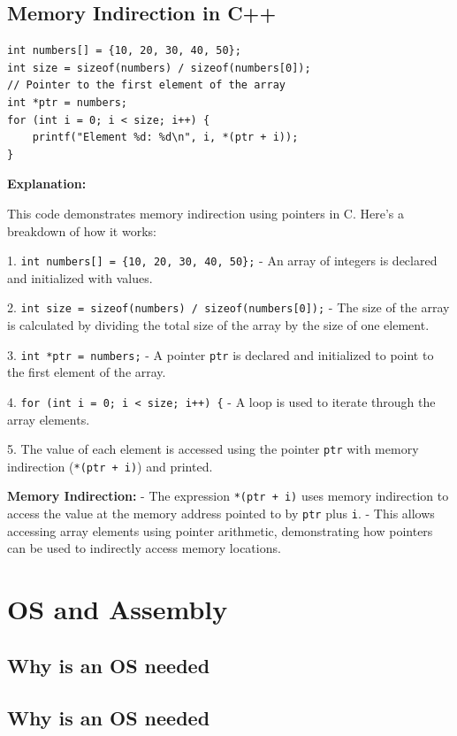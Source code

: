 \documentclass{report}
\begin{document}
\section{Memory Indirection in C++}

\begin{verbatim}
int numbers[] = {10, 20, 30, 40, 50};
int size = sizeof(numbers) / sizeof(numbers[0]);
// Pointer to the first element of the array
int *ptr = numbers;
for (int i = 0; i < size; i++) {
	printf("Element %d: %d\n", i, *(ptr + i));
}
\end{verbatim}

\textbf{Explanation:}

This code demonstrates memory indirection using pointers in C. Here's a breakdown of how it works:

1. \texttt{int numbers[] = \{10, 20, 30, 40, 50\};}
- An array of integers is declared and initialized with values.

2. \texttt{int size = sizeof(numbers) / sizeof(numbers[0]);}
- The size of the array is calculated by dividing the total size of the array by the size of one element.

3. \texttt{int *ptr = numbers;}
- A pointer \texttt{ptr} is declared and initialized to point to the first element of the array.

4. \texttt{for (int i = 0; i < size; i++) \{}
- A loop is used to iterate through the array elements.

5. The value of each element is accessed using the pointer \texttt{ptr} with memory indirection (\texttt{*(ptr + i)}) and printed.

\textbf{Memory Indirection:}
- The expression \texttt{*(ptr + i)} uses memory indirection to access the value at the memory address pointed to by \texttt{ptr} plus \texttt{i}.
- This allows accessing array elements using pointer arithmetic, demonstrating how pointers can be used to indirectly access memory locations.

\chapter{OS and Assembly}

\section{Why is an OS needed}

\section{Why is an OS needed}
\end{document}
